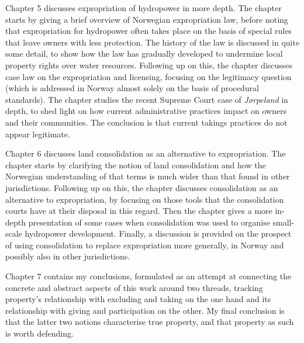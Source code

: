 Chapter 5 discusses expropriation of hydropower in more depth. The chapter starts by giving a brief overview of Norwegian expropriation law, before noting that expropriation for hydropower often takes place on the basis of special rules that leave owners with less protection. The history of the law is discussed in quite some detail, to show how the law has gradually developed to undermine local property rights over water resources. Following up on this, the chapter discusses case law on the expropriation and licensing, focusing on the legitimacy question (which is addressed in Norway almost solely on the basis of procedural standards). The chapter studies the recent Supreme Court case of {\it Jørpeland} in depth, to shed light on how current administrative practices impact on owners and their communities. The conclusion is that current takings practices do not appear legitimate.

Chapter 6 discusses land consolidation as an alternative to expropriation. The chapter starts by clarifying the notion of land consolidation and how the Norwegian understanding of that terms is much wider than that found in other jurisdictions. Following up on this, the chapter discusses consolidation as an alternative to expropriation, by focusing on those tools that the consolidation courts have at their disposal in this regard. Then the chapter gives a more in-depth presentation of some cases when consolidation was used to organise small-scale hydropower development. Finally, a discussion is provided on the prospect of using consolidation to replace expropriation more generally, in Norway and possibly also in other jurisdictions.

Chapter 7 contains my conclusions, formulated as an attempt at connecting the concrete and abstract aspects of this work around two threads, tracking property's relationship with excluding and taking on the one hand and its relationship with giving and participation on the other. My final conclusion is that the latter two notions characterise true property, and that property as such is worth defending.